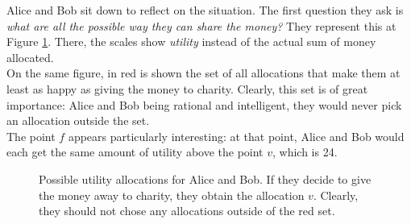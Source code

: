 \begin{example}
Alice and Bob sit down to reflect on the situation.
The first question they ask is \emph{what are all the possible way they can share the money?}
They represent this at Figure \ref{examplePayoff}. There, the scales show \emph{utility} instead of the actual sum of money allocated. \\
On the same figure, in red is shown the set of all allocations that make them at least as happy as giving the money to charity. Clearly, this set is of great importance: Alice and Bob being rational and intelligent, they would never pick an allocation outside the set.\\
The point $f$ appears particularly interesting: at that point, Alice and Bob would each get the same amount of utility above the point $v$, which is 24.
\begin{figure}[!ht]
\centering
{}
\caption{Possible utility allocations for Alice and Bob. If they decide to give the money away to charity, they obtain the allocation $v$. Clearly, they should not chose any allocations outside of the red set.}
\label{examplePayoff}
\end{figure}
\end{example}

